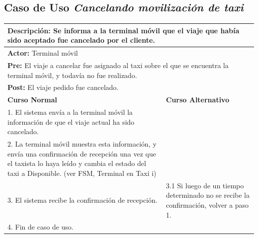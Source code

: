 \documentclass[a4paper]{article}
\begin{document}
\subsection{Caso de Uso \textit{Cancelando movilizaci\'on de taxi}}
\begin{center}
\begin{tabular}{|p{10cm} | p{6cm}|}
\hline
\multicolumn{2}{|p{16cm}|}{\textbf{Descripci\'on:} Se informa a la terminal m\'ovil que el viaje que hab\'ia sido aceptado fue cancelado por el cliente.} \\
\hline
\multicolumn{2}{|p{15cm}|}{\textbf{Actor:} Terminal m\'ovil} \\
\hline
\multicolumn{2}{|p{15cm}|}{\textbf{Pre:} El viaje a cancelar fue asignado al taxi sobre el que se encuentra la terminal m\'ovil, y todav\'ia no fue realizado.} \\
\hline
\multicolumn{2}{|p{15cm}|}{\textbf{Post:} El viaje pedido fue cancelado.}\\
\hline
\textbf{Curso Normal}  & \textbf{Curso Alternativo} \\ \hline
1. El sistema env\'ia a la terminal m\'ovil la informaci\'on de que el viaje actual ha sido cancelado. & \\ \hline
2. La terminal m\'ovil muestra esta informaci\'on, y env\'ia una confirmaci\'on de recepci\'on una vez que el taxista lo haya le\'ido y cambia el estado del taxi a Disponible. (ver FSM, Terminal en Taxi i) & \\ \hline
3. El sistema recibe la confirmaci\'on de recepci\'on. & 3.1 Si luego de un tiempo determinado no se recibe la confirmaci\'on, volver a paso 1. \\  \hline
4. Fin de caso de uso. & \\ \hline
\end{tabular}
\end{center}
\end{document}
